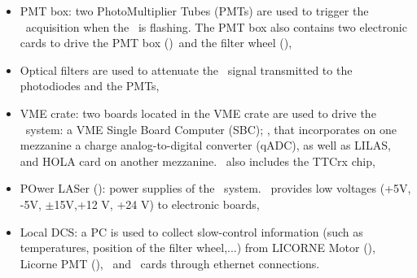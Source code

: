 \begin{itemize}
\item PMT box: two PhotoMultiplier Tubes (PMTs) are used to trigger the \lasii~acquisition when the \laser~is flashing. The PMT box also contains two electronic cards to drive the PMT box (\licpmt)~and the filter wheel (\licmot),

\item Optical filters are used to attenuate the \laser~signal transmitted to the photodiodes and the PMTs,

\item VME crate: two boards located in the VME crate are used to drive the \lasii~system: a VME Single Board Computer (SBC); \lascar, that incorporates on one mezzanine a charge analog-to-digital converter (qADC), as well as LILAS, and HOLA card on another mezzanine. \lascar~also includes the TTCrx chip,

\item POwer LASer (\polas): power supplies of the \lasii~system. \polas~provides low voltages (+5V, -5V, $\pm$15V,+12 V, +24 V) to electronic boards,

\item Local DCS: a PC is used to collect slow-control information (such as temperatures, position of the filter wheel,...) from LICORNE Motor (\licmot), Licorne PMT (\licpmt), \licphd~and \lascar~cards through ethernet connections.


\end{itemize}